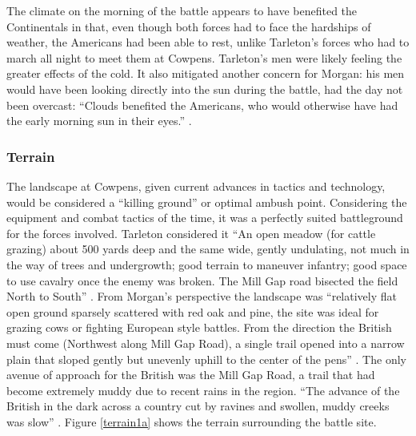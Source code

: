 The climate on the morning of the battle appears to have benefited the
Continentals in that, even though both forces had to face the hardships of
weather, the Americans had been able to rest, unlike Tarleton's forces who had
to march all night to meet them at Cowpens.  Tarleton’s men were likely feeling
the greater effects of the cold.  It also mitigated another concern for Morgan:
his men would have been looking directly into the sun during the battle, had the
day not been overcast: “Clouds benefited the Americans, who would otherwise have
had the early morning sun in their eyes.” \cite[67]{moncure_cowpens_1996}.  

\subsubsection{Terrain}

The landscape at Cowpens, given current advances in tactics and technology,
would be considered a ``killing ground'' or optimal ambush point.  Considering the
equipment and combat tactics of the time, it was a perfectly suited battleground
for the forces involved.  Tarleton considered it ``An open meadow (for cattle
grazing) about 500 yards deep and the same wide, gently undulating, not much in
the way of trees and undergrowth; good terrain to maneuver infantry; good space
to use cavalry once the enemy was broken.  The Mill Gap road bisected the field
North to South'' \cite[326]{stephenson_patriot_2007}.
From Morgan's perspective the landscape was ``relatively flat open ground
sparsely scattered with red oak and pine, the site was ideal for grazing cows or
fighting European style battles.  From the direction the British must come
(Northwest along Mill Gap Road), a single trail opened into a narrow plain that
sloped gently but unevenly uphill to the center of the pens'' \cite[45]{moncure_cowpens_1996}.
The only avenue of approach for the British was the Mill Gap Road, a trail that
had become extremely muddy due to recent rains in the region. ``The advance of
the British in the dark across a country cut by ravines and swollen, muddy
creeks was slow'' \cite[126]{lumpkin_savannah_1981}.  Figure \ref{terrain1a}
shows the terrain surrounding the battle site.  

